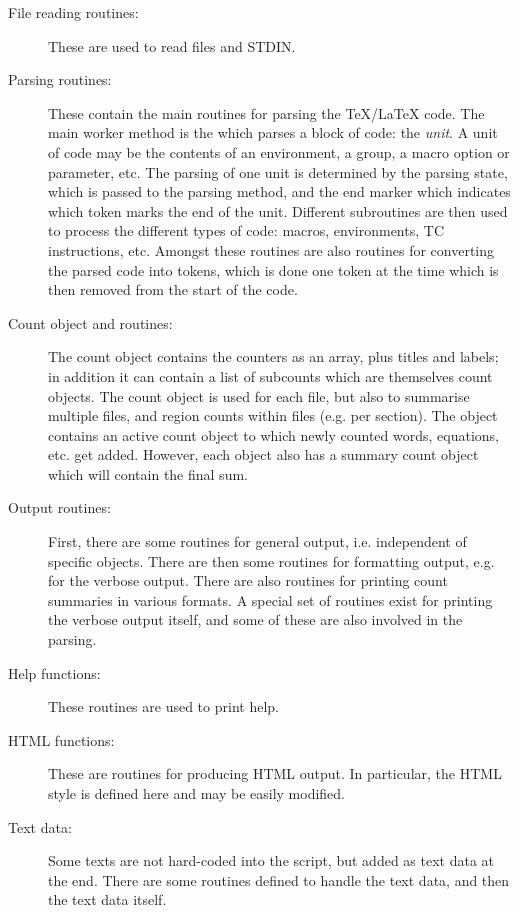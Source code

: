 \documentclass{article}
\begin{document}
\begin{description}
\item[File reading routines:] These are used to read files and STDIN.

\item[Parsing routines:] These contain the main routines for parsing the \TeX/\LaTeX{} code. The main worker method is the  which parses a block of code: the \emph{unit}. A unit of code may be the contents of an environment, a \code{\{\ldots\}} group, a macro option or parameter, etc. The parsing of one unit is determined by the parsing state, which is passed to the parsing method, and the end marker which indicates which token marks the end of the unit. Different subroutines are then used to process the different types of code: macros, environments, TC instructions, etc. Amongst these routines are also routines for converting the parsed code into tokens, which is done one token at the time which is then removed from the start of the code.

\item[Count object and routines:] The count object contains the counters as an array, plus titles and labels; in addition it can contain a list of subcounts which are themselves count objects. The count object is used for each file, but also to summarise multiple files, and region counts within files (e.g. per section). The  object contains an active count object to which newly counted words, equations, etc. get added. However, each  object also has a summary count object which will contain the final sum. 

\item[Output routines:] First, there are some routines for general output, i.e. independent of specific  objects. There are then some routines for formatting output, e.g. for the verbose output. There are also routines for printing count summaries in various formats. A special set of routines exist for printing the verbose output itself, and some of these are also involved in the parsing.

\item[Help functions:] These routines are used to print help.

\item[HTML functions:] These are routines for producing HTML output. In particular, the HTML style is defined here and may be easily modified.

\item[Text data:] Some texts are not hard-coded into the script, but added as text data at the end. There are some routines defined to handle the text data, and then the text data itself.

\end{description}
\end{document}
